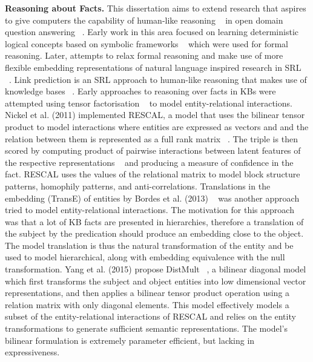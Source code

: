 \textbf{Reasoning about Facts.} This dissertation aims to extend research that aspires to give computers the capability of human-like reasoning ~\citep{bordes2011learning} in open domain question answering ~\citep{hakimov2019evaluating}. Early work in this area focused on learning deterministic logical concepts based on symbolic frameworks ~\citep{hohenecker2017deep} which were used for formal reasoning. Later, attempts to relax formal reasoning and make use of more flexible embedding representations of natural language inspired research in SRL ~\citep{koller2007introduction}. Link prediction is an SRL approach to human-like reasoning that makes use of knowledge bases ~\citep{balazevic2019hypernetwork, dettmers2018convolutional, socher2013reasoning}. \newline
Early approaches to reasoning over facts in KBs were attempted using tensor factorisation ~\citep{nickel2011three} to model entity-relational interactions. Nickel et al. (2011) implemented RESCAL, a model that uses the bilinear tensor product to model interactions where entities are expressed as vectors and and the relation between them is represented as a full rank matrix ~\citep{nickel2012factorizing}. The triple is then scored by computing product of pairwise interactions between latent features of the respective representations ~\citep{nickel2015review} and producing a measure of confidence in the fact. RESCAL uses the values of the relational matrix to model block structure patterns, homophily patterns, and anti-correlations. \newline
Translations in the embedding (TransE) of entities by Bordes et al. (2013) ~\citep{bordes2013translating} was another approach tried to model entity-relational interactions. The motivation for this approach was that a lot of KB facts are presented in hierarchies, therefore a translation of the subject by the predication should produce an embedding close to the object. The model translation is thus the natural transformation of the entity and be used to model hierarchical, along with embedding equivalence with the null transformation. \newline
Yang et al. (2015) propose DistMult ~\citep{yang2014embedding}, a bilinear diagonal model which first transforms the subject and object entities into low dimensional vector representations, and then applies a bilinear tensor product operation using a relation matrix with only diagonal elements. This model effectively models a subset of the entity-relational interactions of RESCAL and relies on the entity transformations to generate sufficient semantic representations. The model's bilinear formulation is extremely parameter efficient, but lacking in expressiveness. \newline
